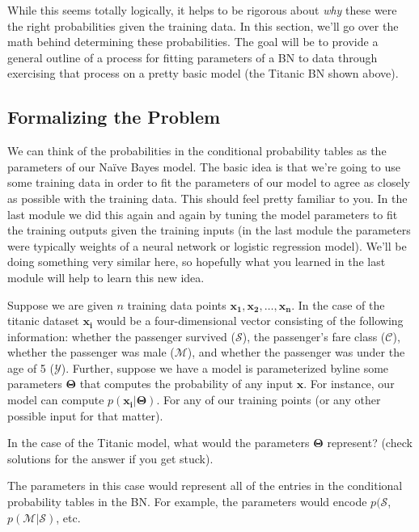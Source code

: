 \documentclass[assignment03_Solutions]{subfiles}
\begin{document}
While this seems totally logically, it helps to be rigorous about \emph{why} these were the right probabilities given the training data.  In this section, we'll go over the math behind determining these probabilities.  The goal will be to provide a general outline of a process for fitting parameters of a BN to data through exercising that process on a pretty basic model (the Titanic BN shown above).

\subsection{Formalizing the Problem}
We can think of the probabilities in the conditional probability tables as the parameters of our Na\"ive Bayes model.  The basic idea is that we're going to use some training data in order to fit the parameters of our model to agree as closely as possible with the training data.  This should feel pretty familiar to you.  In the last module we did this again and again by tuning the model parameters to fit the training outputs given the training inputs (in the last module the parameters were typically weights of a neural network or logistic regression model).  We'll be doing something very similar here, so hopefully what you learned in the last module will help to learn this new idea.

Suppose we are given $n$ training data points $\mathbf{x_1}, \mathbf{x_2}, \ldots, \mathbf{x_n}$.  In the case of the titanic dataset $\mathbf{x_i}$ would be a four-dimensional vector consisting of the following information: whether the passenger survived ($\mathcal{S}$), the passenger's fare class ($\mathcal{C}$), whether the passenger was male ($\mathcal{M}$), and whether the passenger was under the age of 5 ($\mathcal{Y}$).  Further, suppose we have a model is parameterized byline some parameters $\mathbf{\Theta}$ that computes the probability of any input $\mathbf{x}$.  For instance, our model can compute $p(\mathbf{x_i} | \mathbf{\Theta})$.  For any of our training points (or any other possible input for that matter).

\begin{understandingcheck}
In the case of the Titanic model, what would the parameters $\mathbf{\Theta}$ represent? (check solutions for the answer if you get stuck).
\begin{boxedsolution}
The parameters in this case would represent all of the entries in the conditional probability tables in the BN.  For example, the parameters would encode $p(\mathcal{S}$, $p(\mathcal{M}|\mathcal{S})$, etc.
\end{boxedsolution}
\end{understandingcheck}
\end{document}
